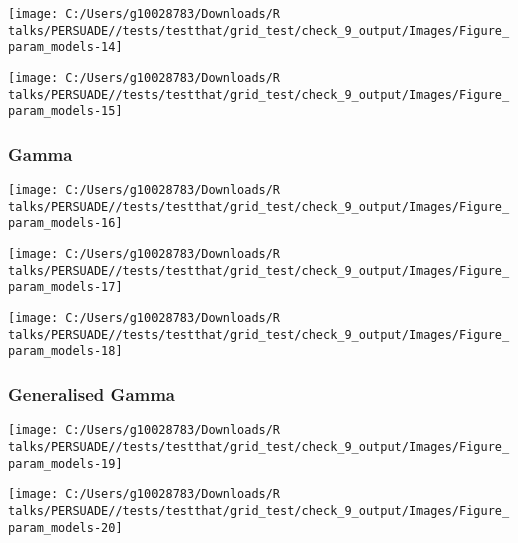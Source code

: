 \documentclass[
]{article}
\begin{document}
\begin{flushleft}\texttt{[image: C:/Users/g10028783/Downloads/R talks/PERSUADE//tests/testthat/grid\_test/check\_9\_output/Images/Figure\_param\_models-14]} \end{flushleft}

\begin{flushleft}\texttt{[image: C:/Users/g10028783/Downloads/R talks/PERSUADE//tests/testthat/grid\_test/check\_9\_output/Images/Figure\_param\_models-15]} \end{flushleft}

\clearpage

\subsubsection{Gamma}\label{gamma}

\begin{flushleft}\texttt{[image: C:/Users/g10028783/Downloads/R talks/PERSUADE//tests/testthat/grid\_test/check\_9\_output/Images/Figure\_param\_models-16]} \end{flushleft}

\begin{flushleft}\texttt{[image: C:/Users/g10028783/Downloads/R talks/PERSUADE//tests/testthat/grid\_test/check\_9\_output/Images/Figure\_param\_models-17]} \end{flushleft}

\begin{flushleft}\texttt{[image: C:/Users/g10028783/Downloads/R talks/PERSUADE//tests/testthat/grid\_test/check\_9\_output/Images/Figure\_param\_models-18]} \end{flushleft}

\clearpage

\subsubsection{Generalised Gamma}\label{generalised-gamma}

\begin{flushleft}\texttt{[image: C:/Users/g10028783/Downloads/R talks/PERSUADE//tests/testthat/grid\_test/check\_9\_output/Images/Figure\_param\_models-19]} \end{flushleft}

\begin{flushleft}\texttt{[image: C:/Users/g10028783/Downloads/R talks/PERSUADE//tests/testthat/grid\_test/check\_9\_output/Images/Figure\_param\_models-20]} \end{flushleft}
\end{document}
